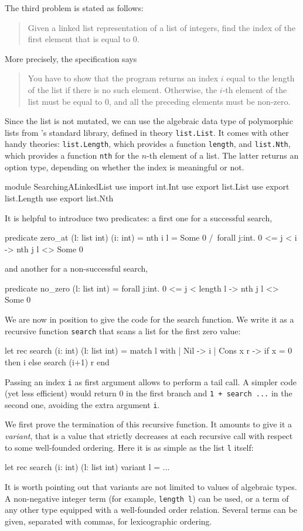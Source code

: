 The third problem is stated as follows:
\begin{quote}
  Given a linked list representation of a list of integers,
  find the index of the first element that is equal to 0.
\end{quote}
More precisely, the specification says
\begin{quote}
  You have to show that the program returns an index $i$ equal to the
  length of the list if there is no such element. Otherwise, the $i$-th
  element of the list must be equal to 0, and all the preceding
  elements must be non-zero.
\end{quote}
Since the list is not mutated, we can use the algebraic data type of
polymorphic lists from \why's standard library, defined in theory
\texttt{list.List}. It comes with other handy theories:
\texttt{list.Length}, which provides a function \texttt{length}, and
\texttt{list.Nth}, which provides a function \texttt{nth}
for the $n$-th element of a list. The latter returns an option type,
depending on whether the index is meaningful or not.
\begin{whycode}
module SearchingALinkedList
  use import int.Int
  use export list.List
  use export list.Length
  use export list.Nth
\end{whycode}
It is helpful to introduce two predicates: a first one
for a successful search,
\begin{whycode}
  predicate zero_at (l: list int) (i: int) =
    nth i l = Some 0 /\ forall j:int. 0 <= j < i -> nth j l <> Some 0
\end{whycode}
and another for a non-successful search,
\begin{whycode}
  predicate no_zero (l: list int) =
    forall j:int. 0 <= j < length l -> nth j l <> Some 0
\end{whycode}
We are now in position to give the code for the search function.
We write it as a recursive function \texttt{search} that scans a list
for the first zero value:
\begin{whycode}
  let rec search (i: int) (l: list int) =
    match l with
    | Nil      -> i
    | Cons x r -> if x = 0 then i else search (i+1) r
    end
\end{whycode}
Passing an index \texttt{i} as first argument allows to perform a tail
call. A simpler code (yet less efficient) would return 0 in the first
branch and \texttt{1 + search ...} in the second one, avoiding the
extra argument \texttt{i}.

We first prove the termination of this recursive function. It amounts
to give it a \emph{variant}, that is a value that strictly decreases
at each recursive call with respect to some well-founded ordering.
Here it is as simple as the list \texttt{l} itself:
\begin{whycode}
  let rec search (i: int) (l: list int) variant { l } = ...
\end{whycode}
It is worth pointing out that variants are not limited to values
of algebraic types. A non-negative integer term (for example,
\texttt{length l}) can be used, or a term of any other type
equipped with a well-founded order relation.
Several terms can be given, separated with commas,
for lexicographic ordering.

